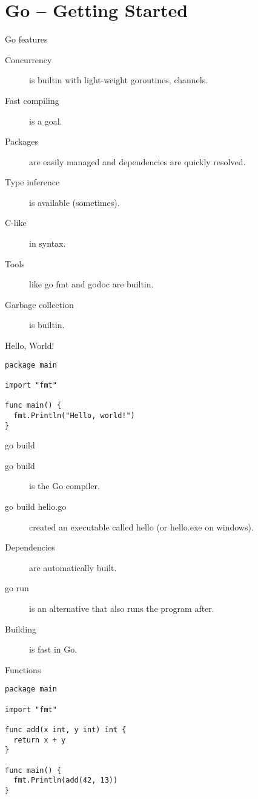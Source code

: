 
\section{Go -- Getting Started}

\begin{frame}{Go features}
  \begin{description}
    \item[Concurrency] is builtin with light-weight goroutines, channels.  
    \item[Fast compiling] is a goal.
    \item[Packages] are easily managed and dependencies are quickly resolved.
    \item[Type inference] is available (sometimes).
    \item[C-like] in syntax. 
    \item[Tools] like go fmt and godoc are builtin. 
    \item[Garbage collection] is builtin.
  \end{description}
\end{frame}

\begin{frame}[fragile]{Hello, World!}
  \begin{verbatim}
package main

import "fmt"

func main() {
  fmt.Println("Hello, world!")
}
  \end{verbatim}
\end{frame}

\begin{frame}{go build}
  \begin{description}
    \item[go build] is the Go compiler.
    \item[go build hello.go] created an executable called hello (or hello.exe on windows).
    \item[Dependencies] are automatically built.
    \item[go run] is an alternative that also runs the program after.
    \item[Building] is fast in Go.
  \end{description}
  
\end{frame}


\begin{frame}[fragile]{Functions}
  \begin{verbatim}
package main

import "fmt"

func add(x int, y int) int {
  return x + y
}

func main() {
  fmt.Println(add(42, 13))
}
  \end{verbatim}
\end{frame}


